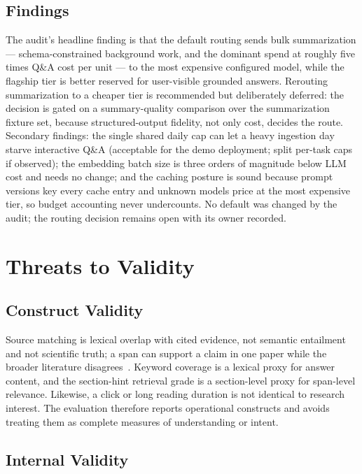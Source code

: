 \subsection{Findings}

The audit's headline finding is that the default routing sends bulk summarization --- schema-constrained background work, and the dominant spend at roughly five times Q\&A cost per unit --- to the most expensive configured model, while the flagship tier is better reserved for user-visible grounded answers.
Rerouting summarization to a cheaper tier is recommended but deliberately deferred: the decision is gated on a summary-quality comparison over the summarization fixture set, because structured-output fidelity, not only cost, decides the route.
Secondary findings: the single shared daily cap can let a heavy ingestion day starve interactive Q\&A (acceptable for the demo deployment; split per-task caps if observed); the embedding batch size is three orders of magnitude below LLM cost and needs no change; and the caching posture is sound because prompt versions key every cache entry and unknown models price at the most expensive tier, so budget accounting never undercounts.
No default was changed by the audit; the routing decision remains open with its owner recorded.

\section{Threats to Validity}

\subsection{Construct Validity}

Source matching is lexical overlap with cited evidence, not semantic entailment and not scientific truth; a span can support a claim in one paper while the broader literature disagrees~\cite{wadden2020scifact}.
Keyword coverage is a lexical proxy for answer content, and the section-hint retrieval grade is a section-level proxy for span-level relevance.
Likewise, a click or long reading duration is not identical to research interest.
The evaluation therefore reports operational constructs and avoids treating them as complete measures of understanding or intent.

\subsection{Internal Validity}

